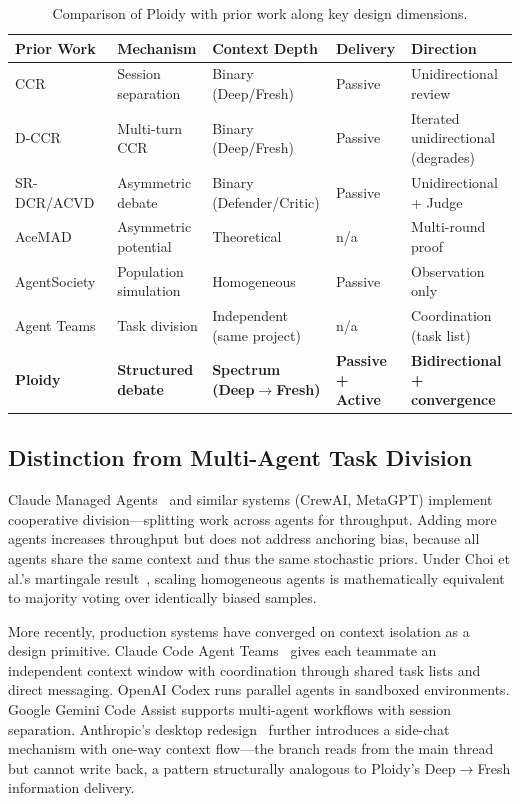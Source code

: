 \documentclass[11pt]{article}
\begin{document}
\begin{table}[t]
\centering
\caption{Comparison of Ploidy with prior work along key design dimensions.}
\label{tab:prior-work}
\footnotesize
\setlength{\tabcolsep}{4pt}
\begin{tabular}{@{}p{3.2cm}p{2.4cm}p{3cm}p{2.2cm}p{3cm}@{}}
\toprule
\textbf{Prior Work} & \textbf{Mechanism} & \textbf{Context Depth} & \textbf{Delivery} & \textbf{Direction} \\
\midrule
CCR~\citep{song2026ccr} & Session separation & Binary (Deep/Fresh) & Passive & Unidirectional review \\[3pt]
D-CCR~\citep{song2026dccr} & Multi-turn CCR & Binary (Deep/Fresh) & Passive & Iterated unidirectional (degrades) \\[3pt]
SR-DCR/ACVD~\citep{srdcr2025} & Asymmetric debate & Binary (Defender/Critic) & Passive & Unidirectional + Judge \\[3pt]
AceMAD~\citep{liu2026acemad} & Asymmetric potential & Theoretical & n/a & Multi-round proof \\[3pt]
AgentSociety~\citep{pang2025agentsociety} & Population simulation & Homogeneous & Passive & Observation only \\[3pt]
Agent Teams~\citep{anthropic2026agentteams} & Task division & Independent (same project) & n/a & Coordination (task list) \\[3pt]
\textbf{Ploidy} & \textbf{Structured debate} & \textbf{Spectrum (Deep$\to$Fresh)} & \textbf{Passive + Active} & \textbf{Bidirectional + convergence} \\
\bottomrule
\end{tabular}
\end{table}

\subsection{Distinction from Multi-Agent Task Division}
\label{sec:distinction}

Claude Managed Agents~\citep{anthropic2026managedagents} and similar systems (CrewAI, MetaGPT) implement cooperative division---splitting work across agents for throughput. Adding more agents increases throughput but does not address anchoring bias, because all agents share the same context and thus the same stochastic priors. Under Choi et al.'s martingale result~\citep{choi2025debate}, scaling homogeneous agents is mathematically equivalent to majority voting over identically biased samples.

More recently, production systems have converged on context isolation as a design primitive. Claude Code Agent Teams~\citep{anthropic2026agentteams} gives each teammate an independent context window with coordination through shared task lists and direct messaging. OpenAI Codex runs parallel agents in sandboxed environments. Google Gemini Code Assist supports multi-agent workflows with session separation. Anthropic's desktop redesign~\citep{anthropic2026desktopredesign} further introduces a side-chat mechanism with one-way context flow---the branch reads from the main thread but cannot write back, a pattern structurally analogous to Ploidy's Deep$\to$Fresh information delivery.
\end{document}
